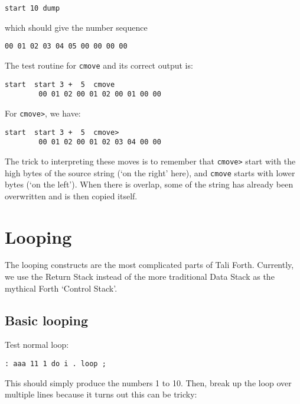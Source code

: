 \begin{lstlisting}[frame=lines]
        start 10 dump
\end{lstlisting}

\noindent which should give the number sequence

\begin{lstlisting}[frame=lines]
        00 01 02 03 04 05 00 00 00 00
\end{lstlisting}

\noindent The test routine for \texttt{cmove} and its correct output is:

\begin{lstlisting}[frame=lines]
        start  start 3 +  5  cmove
        00 01 02 00 01 02 00 01 00 00
\end{lstlisting}

\indent For \texttt{cmove>}, we have: 

\begin{lstlisting}[frame=lines]
        start  start 3 +  5  cmove>
        00 01 02 00 01 02 03 04 00 00
\end{lstlisting}

The trick to interpreting these moves is to remember that \texttt{cmove>} start
with the high bytes of the source string (`on the right' here), and
\texttt{cmove} starts with lower bytes (`on the left'). When there is overlap,
some of the string has already been overwritten and is then copied itself.

\section{Looping}

The looping constructs are the most complicated parts of Tali Forth. Currently,
we use the Return Stack instead of the more traditional Data Stack as the
mythical Forth `Control Stack'.

\subsection{Basic looping}

Test normal loop:
\begin{lstlisting}[frame=lines]
        : aaa 11 1 do i . loop ;        
\end{lstlisting}

\noindent This should simply produce the numbers 1 to 10. Then, break up the
loop over multiple lines because it turns out this can be tricky:

